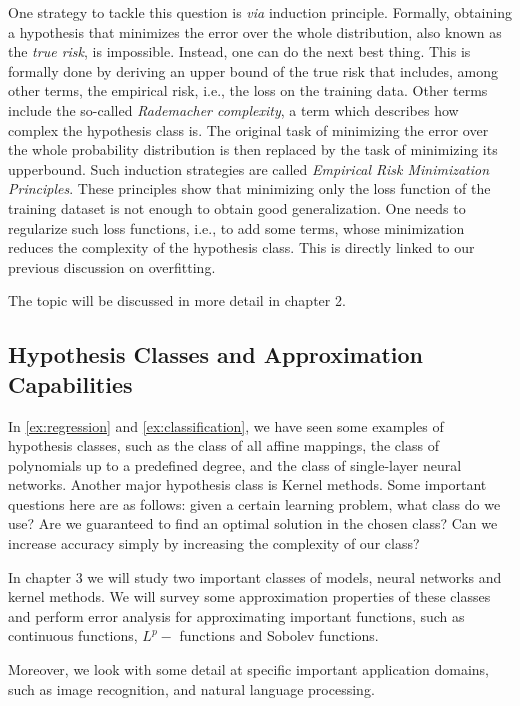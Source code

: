 One strategy to tackle this question is \emph{via} induction principle.
Formally, obtaining a hypothesis that minimizes the error over the whole
distribution, also known as the \emph{true risk}, is impossible. Instead, one
can do the next best thing. This is formally done by deriving an upper bound of
the true risk that includes, among other terms, the empirical risk, i.e., the
loss on the training data. Other terms include the so-called \emph{Rademacher
complexity}, a term which describes how complex the hypothesis class is. The
original task of minimizing the error over the whole probability distribution is
then replaced by the task of minimizing its upperbound. Such induction
strategies are called \emph{Empirical Risk Minimization Principles}. These
principles show that minimizing only the loss function of the training dataset
is not enough to obtain good generalization. One needs to regularize such loss
functions, i.e., to add some terms, whose minimization reduces the complexity of
the hypothesis class. This is directly linked to our previous discussion on
overfitting. 

The topic will be discussed in more detail in chapter 2.

\subsection{Hypothesis Classes and Approximation Capabilities}
In \autoref{ex:regression} and \autoref{ex:classification}, we have seen some
examples of hypothesis classes, such as the class of all affine mappings, the
class of polynomials up to a predefined degree, and the class of single-layer
neural networks. Another major hypothesis class is Kernel methods. Some
important questions here are as follows: given a certain learning problem, what
class do we use? Are we guaranteed to find an optimal solution in the chosen
class? Can we increase accuracy simply by increasing the complexity of our
class?

In chapter 3 we will study two important classes of models, neural networks
and kernel methods. We will survey some approximation properties of these classes and
perform error analysis for approximating important functions, such as continuous
functions, $L^p-$ functions and Sobolev functions. 

Moreover, we look with some detail at specific important application domains,
such as image recognition, and natural language processing.

